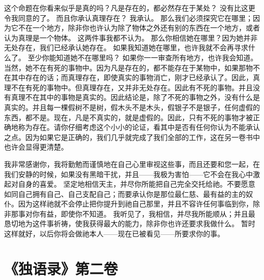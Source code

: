  这个命题在你看来似乎是真的吗？凡是存在的，都必然存在于某处？ 没有比这更令我同意的了。 而且你承认真理存在？ 我承认。 那么我们必须探究它在哪里；因为它不在一个地方，除非你也许认为除了物体之外还有别的东西在一个地方，或者认为真理是一个物体。 这两件事我都不认为。 那么你相信她在哪里？因为她并非无处存在，我们已经承认她存在。 如果我知道她在哪里，也许我就不会再寻求什么了。 至少你能知道她不在哪里吗？ 如果你一一审查所有地方，也许我会知道。 当然，她不在有死的事物中。因为凡是存在的，都不能存在于某物中，如果那物不在其中存在的话；而真理存在，即使真实的事物消亡，刚才已经承认了。因此，真理不在有死的事物中。但真理存在，又并非无处存在。因此有不死的事物。并且没有真理不在其中的事物是真实的。因此结论是，除了不死的事物之外，没有什么是真实的。并且每一棵假树不是树，假木头不是木头，假银子不是银子，任何虚假的东西，都不是。现在，凡是不真实的，就是虚假的。因此，只有不死的事物才被正确地称为存在。请你仔细考虑这个小小的论证，看其中是否有任何你认为不能承认之点。因为如果它是正确的，我们几乎就完成了我们全部的工作，这在另一卷书中也许会显得更清楚。\par

 我非常感谢你，我将勤勉而谨慎地在自己心里审视这些事，而且还要和您一起，在我们安静的时候，如果没有黑暗干扰，并且——我极为害怕——它不会在我心中激起对自身的喜爱。 坚定地相信天主，并尽你所能把自己完全交托给祂。不要愿意如同自己拥有自己、自己支配自己；而要承认你是那位最仁慈、最有益的主的奴仆。因为这样祂就不会停止把你提升到祂自己那里，并且不容许任何事临到你，除非那事对你有益，即使你不知道。 我听见了，我相信，并尽我所能顺从；并且最恳切地为这件事祈祷，使我获得最大的能力，除非你也许还要求我做什么。 暂时这样就好，以后你将会做祂本人——现在已被看见——所要求你的事。\par



\section{《独语录》第二卷}

